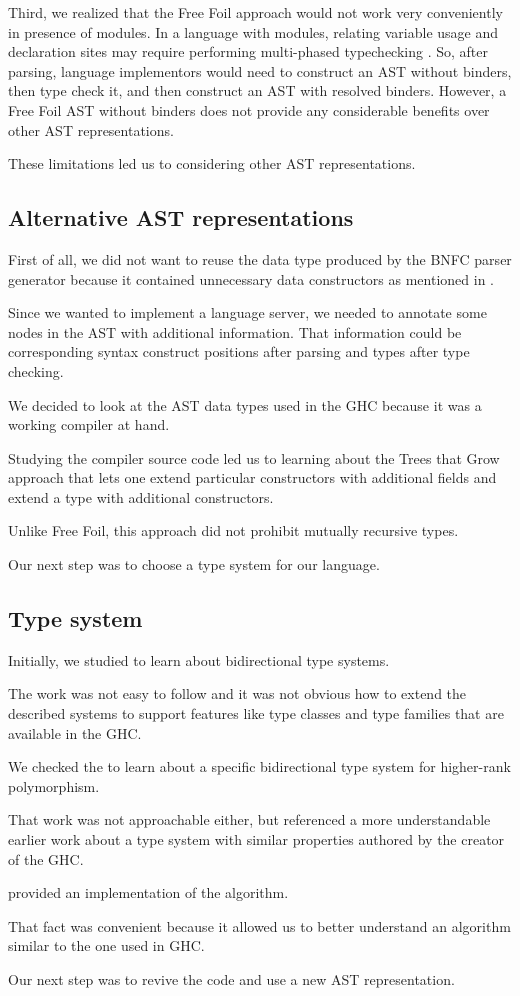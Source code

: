Third, we realized that the Free Foil approach would not work very conveniently in presence of modules.
In a language with modules, relating variable usage and declaration sites may require performing multi-phased typechecking \cite{poulsen-monadic-2023}.
So, after parsing, language implementors would need to construct an AST without binders, then type check it, and then construct an AST with resolved binders.
However, a Free Foil AST without binders does not provide any considerable benefits over other AST representations.

These limitations led us to considering other AST representations.

\subsection{Alternative AST representations}

First of all, we did not want to reuse the data type produced by the BNFC parser generator because it contained unnecessary data constructors as mentioned in .

Since we wanted to implement a language server, we needed to annotate some nodes in the AST with additional information.
That information could be corresponding syntax construct positions after parsing and types after type checking.

We decided to look at the AST data types used in the GHC because it was a working compiler at hand.

Studying the compiler source code led us to learning about the Trees that Grow approach that lets one extend particular constructors with additional fields and extend a type with additional constructors.

Unlike Free Foil, this approach did not prohibit mutually recursive types.

Our next step was to choose a type system for our language.

\subsection{Type system}

Initially, we studied \cite{dunfield-bidirectional-2020} to learn about bidirectional type systems.

The work was not easy to follow and it was not obvious how to extend the described systems to support features like type classes and type families that are available in the GHC.

We checked the \cite{dunfield-complete-2020} to learn about a specific bidirectional type system for higher-rank polymorphism.

That work was not approachable either, but referenced a more understandable earlier work about a type system with similar properties \cite{jones-practical-2007} authored by the creator of the GHC.

\cite{jones-practical-2007} provided an implementation of the algorithm.

That fact was convenient because it allowed us to better understand an algorithm similar to the one used in GHC.

Our next step was to revive the code and use a new AST representation.